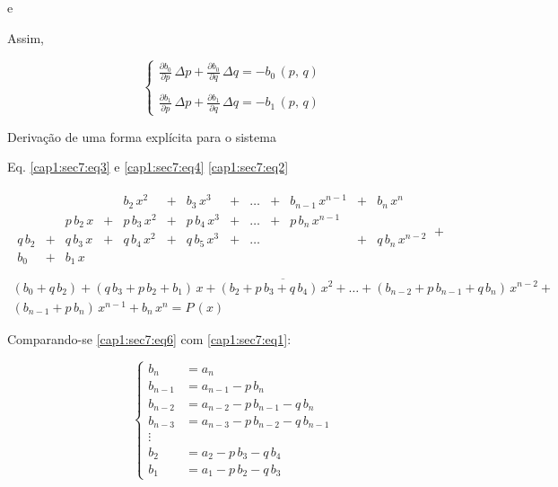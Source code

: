  e 

Assim,

\begin{equation}
 \label{cap1:sec7:eq8}
 \left\{
 \begin{array}{l}
  \displaystyle \frac{\partial b_0}{\partial p} \, \Delta p + \frac{\partial b_0}{\partial q} \, \Delta q = - b_0\,(p,\,q) \\
  \\
  \displaystyle \frac{\partial b_1}{\partial p} \, \Delta p + \frac{\partial b_1}{\partial q} \, \Delta q = - b_1\,(p,\,q)
 \end{array}
 \right.
\end{equation}

Derivação de uma forma explícita para o sistema

Eq. \ref{cap1:sec7:eq3} e \ref{cap1:sec7:eq4} \esp{\Rightarrow} \ref{cap1:sec7:eq2}

\begin{equation}
 \label{cap1:sec7:eq6}
 \begin{array}{l}
 \begin{array}{rrrrrrrrrrrrl}
         &   &           &   & b_2\,x^2 & + & b_3 \, x^3 & + & \ldots & + & b_{n-1}\,x^{n-1} & + & b_n\,x^n \\
         &   & p\,b_2\,x & + & p\,b_3\,x^2 & + & p\,b_4\,x^3 & + & \ldots & + & p\,b_n\,x^{n-1} & & \\
  q\,b_2 & + & q\,b_3\,x & + & q\,b_4\,x^2 & + & q\,b_5\,x^3 & + & \ldots & & & + & q\,b_n\,x^{n-2} \\
  b_0    & + & b_1\,x & & & & & & & & & & \\
 \end{array}
 +
 \\
 \overline{ (b_0 + q\,b_2) + (q\,b_3 + p\,b_2 + b_1)\,x + (b_2 + p\,b_3 + q\,b_4)\,x^2 + \ldots + (b_{n-2} + p\,b_{n-1} + q\,b_n)\,x^{n-2} + }\\
 (b_{n-1} + p\,b_n)\,x^{n-1} + b_n\,x^n = P\,(x)
 \end{array}
\end{equation}

Comparando-se \ref{cap1:sec7:eq6} com \ref{cap1:sec7:eq1}:

\begin{equation}
 \label{cap1:sec7:eq7}
 \left\{
 \begin{array}{cl}
  b_n     & = a_n \\
  b_{n-1} & = a_{n-1} - p\,b_n \\
  b_{n-2} & = a_{n-2} - p\,b_{n-1} - q\,b_n \\
  b_{n-3} & = a_{n-3} - p\,b_{n-2} - q\,b_{n-1} \\
  \vdots  & \\
  b_2     & = a_2 - p\,b_3 - q\,b_4 \\
  b_1     & = a_1 - p\,b_2 - q\,b_3
 \end{array}
 \right.
\end{equation}

